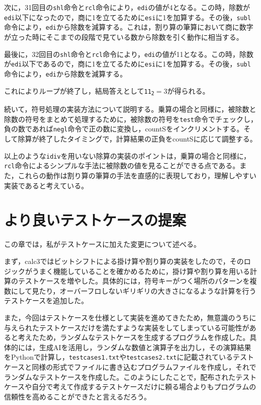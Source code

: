 \documentclass[a4paper]{jsarticle}
\newcommand{\var}[1]{\texttt{#1}}
\begin{document}
次に，31回目の\var{shl}命令と\var{rcl}命令により，\var{edi}の値が4となる。この時，除数が\var{edi}以下になったので，商に1を立てるために\var{esi}に1を加算する。その後，\var{subl}命令により，\var{edi}から除数を減算する。これは，割り算の筆算において商に数字が立った時にそこまでの段階で見ている数から除数を引く動作に相当する。

最後に，32回目の\var{shl}命令と\var{rcl}命令により，\var{edi}の値が11となる。この時，除数が\var{edi}以下であるので，商に1を立てるために\var{esi}に1を加算する。その後，\var{subl}命令により，\var{edi}から除数を減算する。

これによりループが終了し，結局答えとして\texttt{11\textsubscript{2}}$=3$が得られる。


続いて，符号処理の実装方法について説明する。乗算の場合と同様に，被除数と除数の符号をまとめて処理するために，被除数の符号を\var{test}命令でチェックし，負の数であれば\var{negl}命令で正の数に変換し，countSをインクリメントする。そして除算が終了したタイミングで，計算結果の正負をcountSに応じて調整する。

以上のような\var{idiv}を用いない除算の実装のポイントは，乗算の場合と同様に，\var{rcl}命令によるシンプルな手法に被除数の値を見ることができる点である。また，これらの動作は割り算の筆算の手法を直感的に表現しており，理解しやすい実装であると考えている。

\section{より良いテストケースの提案}
この章では，私がテストケースに加えた変更について述べる。

まず，calc3ではビットシフトによる掛け算や割り算の実装をしたので，そのロジックがうまく機能していることを確かめるために，掛け算や割り算を用いる計算のテストケースを増やした。具体的には，符号キーがつく場所のパターンを複数にして見たり，オーバーフロしないギリギリの大きさになるような計算を行うテストケースを追加した。

また，今回はテストケースを仕様として実装を進めてきたため，無意識のうちに与えられたテストケースだけを満たすような実装をしてしまっている可能性があると考えたため，ランダムなテストケースを生成するプログラムを作成した。具体的には，生成AIを活用し，ランダムな数値と演算子を出力し，その演算結果をPythonで計算し，\var{testcases1.txt}や\var{testcases2.txt}に記載されているテストケースと同様の形式でファイルに書き込むプログラムファイルを作成し，それでランダムなテストケースを作成した。このようにしたことで，配布されたテストケースや自分で考えて作成するテストケースだけに頼る場合よりもプログラムの信頼性を高めることができたと言えるだろう。
\end{document}
